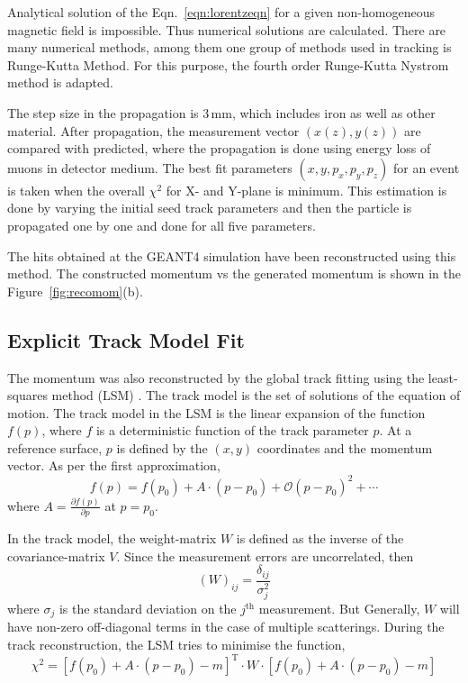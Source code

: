 Analytical solution of the Eqn.~\ref{eqn:lorentzeqn} for a given
non-homogeneous magnetic field is impossible. Thus numerical solutions
are calculated. There are many numerical methods, among them one group
of methods used in tracking is Runge-Kutta Method. For this purpose,
the fourth order Runge-Kutta Nystrom \cite{lund2009track} method is
adapted.

The step size in the propagation is 3\,mm, which includes iron as well
as other material. After propagation, the measurement vector
$(x(z),y(z))$ are compared with predicted, where the propagation is done
using energy loss of muons in detector medium. The best fit parameters
$(x,y,p_{x},p_{y},p_{z})$ for an event is taken when the overall
$\chi^{2}$ for X- and Y-plane is minimum. This estimation is done by
varying the initial seed track parameters and then the particle is
propagated one by one and done for all five parameters.    

The hits obtained at the GEANT4 simulation have been reconstructed
using this method. The constructed momentum vs the generated momentum
is shown in the Figure~\ref{fig:recomom}(b).

\subsection{Explicit Track Model Fit}
The momentum was also reconstructed by the global track fitting using
the least-squares method (LSM) \cite{explicit1}. The track model is
the set of solutions of the equation of motion. The track model in the
LSM is the linear expansion of the function $f\left(p\right)$, where
$f$ is a deterministic function of the track parameter $p$. At a
reference surface, $p$ is defined by the $\left(x,y\right)$
coordinates and the momentum vector. As per the first approximation,
\begin{equation}
  f\left(p\right) = f\left(p_{0}\right) + A\cdot \left(p-p_{0}\right) + \mathcal{O} \left(p-p_{0}\right)^{2}+\cdots
\end{equation}
where $A=\frac{\partial f\left(p\right)}{\partial p}$ at $p=p_{0}$.

In the track model, the weight-matrix $W$ is defined as the inverse of
the covariance-matrix $V$. Since the measurement errors are
uncorrelated, then
\begin{equation}
  \left(W\right)_{ij} = \frac{\delta_{ij}}{\sigma_{j}^{2}}
\end{equation}
where $\sigma_{j}$ is the standard deviation on the $j^{\text{th}}$
measurement. But Generally, $W$ will have non-zero off-diagonal terms
in the case of multiple scatterings. During the track reconstruction,
the LSM tries to minimise the function,
\begin{equation}
  \chi^{2} = \left[f\left(p_{0}\right)+ A\cdot \left(p-p_{0}\right) - m\right]^{\mathrm{T}} \cdot W \cdot \left[f\left(p_{0}\right)+ A\cdot \left(p-p_{0}\right) - m\right]
\end{equation}

